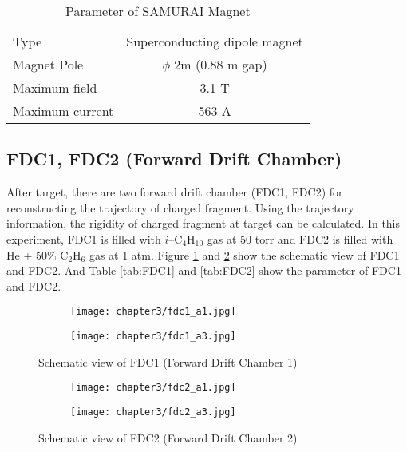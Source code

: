 \begin{table}[h]
    \centering 
    \begin{tabular}{l|c}
    \hline
    Type & Superconducting dipole magnet \\
    Magnet Pole & $\phi$ 2m (0.88 m gap) \\
    Maximum field & 3.1 T \\
    Maximum current & 563 A \\
    \hline
    \end{tabular}
    \caption{Parameter of SAMURAI Magnet \cite{SAMURAI}}
    \label{tab:SAMURAI_Magnet}
\end{table}

\subsection{FDC1, FDC2 (Forward Drift Chamber)}
After target, there are two forward drift chamber (FDC1, FDC2) for reconstructing the trajectory of charged fragment. Using the trajectory information, the rigidity of charged fragment at target can be calculated. In this experiment, FDC1 is filled with $i$--${\text{C}}_{4} {\text{H}}_{10}$ gas at 50 torr and FDC2 is filled with He + 50\% ${\text{C}}_{2} {\text{H}}_{6}$ gas at 1 atm. Figure \ref{fig:FDC1} and \ref{fig:FDC2} show the schematic view of FDC1 and FDC2. And Table \ref{tab:FDC1} and \ref{tab:FDC2} show the parameter of FDC1 and FDC2.

\begin{figure}[h]
    \centering
    \begin{subfigure}{\textwidth}
        \centering
        \texttt{[image: chapter3/fdc1\_a1.jpg]}    
    \end{subfigure}
    \begin{subfigure}{\textwidth}
        \hspace{1.5cm}
        \texttt{[image: chapter3/fdc1\_a3.jpg]}
    \end{subfigure}
    \caption{Schematic view of FDC1 (Forward Drift Chamber 1) \cite{SAMURAI}}
    \label{fig:FDC1}
\end{figure}
\clearpage

\begin{figure}[h]
    \centering
    \begin{subfigure}{\textwidth}
        \centering
        \texttt{[image: chapter3/fdc2\_a1.jpg]}    
    \end{subfigure}
    \begin{subfigure}{\textwidth}
        \hspace{1.5cm}
        \texttt{[image: chapter3/fdc2\_a3.jpg]}
    \end{subfigure}
    \caption{Schematic view of FDC2 (Forward Drift Chamber 2) \cite{SAMURAI}}
    \label{fig:FDC2}
\end{figure}
\clearpage

